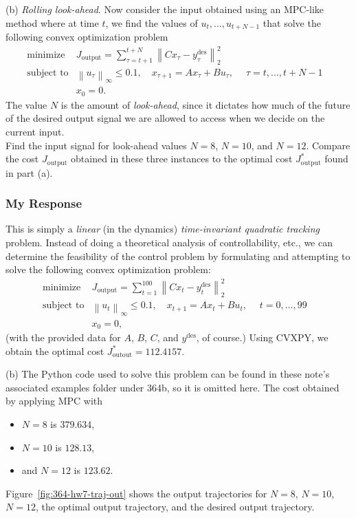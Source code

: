 \documentclass[12pt,reqno]{article}
\theoremstyle{definition}
\numberwithin{equation}{section}
\begin{document}
    \noindent (b) \textit{Rolling look-ahead}. Now consider the input obtained using an MPC-like method
    where at time $t$, we find the values of $u_t, \ldots, u_{t+N-1}$ that solve the following convex optimization
    problem
    \[\begin{array}{lll}
        \text{minimize} \; & J_{\text{output}} =  \sum_{\tau=t+1}^{t+N}\left\lVert Cx_\tau - y_\tau^{\text{des}} \right\rVert_{2}^2 & \\
        \text{subject to} & \left\lVert u_\tau \right\rVert_{\infty} \le 0.1, \quad x_{\tau+1} = Ax_\tau + Bu_\tau, \; \quad \tau = t, \ldots, t + N - 1 & \\
        &x_0 = 0.
        \end{array}\]
    The value $N$ is the amount of \textit{look-ahead}, since it dictates how much of the future of the desired
    output signal we are allowed to access when we decide on the current input.\\
    Find the input signal for look-ahead values $N=8$, $N=10$, and $N=12$. Compare the cost $J_{\text{output}}$
    obtained in these three instances to the optimal cost $J_{\text{output}}^{*}$ found in part (a).
    
\subsubsection*{My Response}
    
    This is simply a \textit{linear} (in the dynamics) \textit{time-invariant quadratic tracking} problem.
    Instead of doing a theoretical analysis of controllability, etc., we can determine the feasibility
    of the control problem by formulating and attempting to solve the following convex optimization problem:
    \[\begin{array}{lll}
    \text{minimize} \; & J_{\text{output}} = \sum_{t=1}^{100}\left\lVert Cx_t - y_t^{\text{des}} \right\rVert_{2}^2 & \\
    \text{subject to} & \left\lVert u_t \right\rVert_{\infty} \le 0.1, \quad x_{t+1} = Ax_t + Bu_t, \; \quad t = 0, \ldots, 99 & \\
    &x_0 = 0,
    \end{array}\]
    (with the provided data for $A$, $B$, $C$, and $y^{\text{des}}$, of course.) Using CVXPY, we obtain the optimal cost 
    $J_{\text{outout}}^{*} = 112.4157$.
    
    \noindent (b) The Python code used to solve this problem can be found in these note's associated examples folder under 364b,
    so it is omitted here. The cost obtained by applying MPC with 
    \begin{itemize}
        \item $N = 8$ is $379.634$,
        \item $N = 10$ is $128.13$,
        \item and $N=12$ is $123.62$.
    \end{itemize}
    Figure~\ref{fig:364-hw7-traj-out} shows the output trajectories for $N=8$, $N=10$, $N=12$,
    the optimal output trajectory, and the desired output trajectory.
\end{document}
